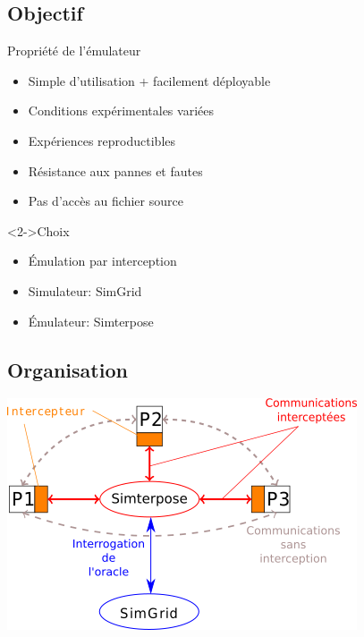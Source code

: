 \documentclass[10.5pt]{beamer}
\begin{document}
\subsection{Objectif}
\begin{frame}{\subsecname}
  
  \begin{alertblock}{Propriété de l'émulateur}
    \begin{itemize}
    \item Simple d'utilisation + facilement déployable
    \item Conditions expérimentales variées
    \item Expériences reproductibles 
    \item Résistance aux pannes et fautes
    \item Pas d'accès au fichier source
    \end{itemize}
  \end{alertblock}

  \begin{block}<2->{Choix}
    \begin{itemize}
  \item Émulation par interception
  \item Simulateur: SimGrid
  \item Émulateur: Simterpose
    \end{itemize}
  \end{block}
\end{frame}

\subsection{Organisation}
\begin{frame}{\secname}
  \centering
  \includegraphics[scale=0.65]{Pictures/png/Communications_Simterpose_interprocess_v1}
\end{frame}
\end{document}
